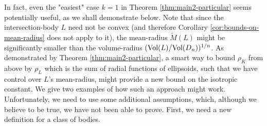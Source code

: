 \documentclass[12pt,oneside]{amsart}
\newtheorem{cor}[thm]{Corollary}
\theoremstyle{definition}
\theoremstyle{remark}
\theoremstyle{proof}
\numberwithin{equation}{section}
\newcommand{\brac}[1]{\left(#1\right)}
\renewcommand{\MR}{\widetilde{M}} %
\renewcommand{\L}{\mathcal{L}}
\newcommand{\Vol}[1]{\textnormal{Vol} (#1)}
\newcommand{\VolRatio}[2]{\brac{\frac{\Vol{#1}}{\Vol{#2}}}^{1/n}}
\begin{document}
%

In fact, even the "easiest" case $k=1$ in Theorem
\ref{thm:main2-particular} seems potentially useful, as we shall
demonstrate below. Note that since the intersection-body $L$ need
not be convex (and therefore Corollary
\ref{cor:bounds-on-mean-radius} does not apply to it), the
mean-radius $\MR(L)$ might be significantly smaller than the
volume-radius $(\Vol{L}/\Vol{D_n})^{1/n}$. As demonstrated by
Theorem \ref{thm:main2-particular}, a smart way to bound $\rho_K$
from above by $\rho_L$ which is the sum of radial functions of
ellipsoids, such that we have control over $L$'s mean-radius,
might provide a new bound on the isotropic constant. We give two
examples of how such an approach might work. Unfortunately, we
need to use some additional assumptions, which, although we
believe to be true, we have not been able to prove. First, we
need a new definition for a class of bodies.
\end{document}
